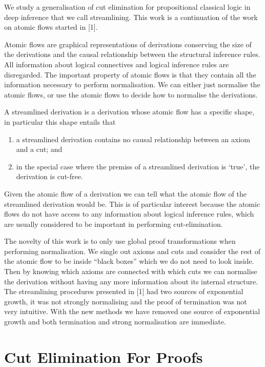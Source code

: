 \documentclass[a4paper]{amsart}
\theoremstyle{remark}
\theoremstyle{definition}
\begin{document}
We study a generalisation of cut elimination for propositional classical logic in deep inference that we call streamlining. This work is a continuation of the work on atomic ﬂows started in [1].

Atomic ﬂows are graphical representations of derivations conserving the size of the derivations and the causal relationship between the structural inference rules. All information about logical connectives and logical inference rules are disregarded. The important property of atomic ﬂows is that they contain all the information necessary to perform normalisation. We can either just normalise the atomic ﬂows, or use the atomic ﬂows to decide how to normalise the derivations.

A streamlined derivation is a derivation whose atomic ﬂow has a speciﬁc
shape, in particular this shape entails that

\begin{enumerate}
\item a streamlined derivation contains no causal relationship between an axiom and a cut; and
\item in the special case where the premiss of a streamlined derivation is ‘true’, the derivation is cut-free.
\end{enumerate}

Given the atomic ﬂow of a derivation we can tell what the atomic ﬂow of the streamlined derivation would be. This is of particular interest because the atomic ﬂows do not have access to any information about logical inference rules, which are usually considered to be important in performing cut-elimination.

The novelty of this work is to only use global proof transformations when performing normalisation. We single out axioms and cuts and consider the rest of the atomic ﬂow to be inside ``black boxes'' which we do not need to look inside. Then by knowing which axioms are connected with which cuts we can normalise the derivation without having any more information about its internal structure. The streamlining procedures presented in [1] had two sources of exponential growth, it was not strongly normalising and the proof of termination was not very intuitive. With the new methods we have removed one source of exponential growth and both termination and strong normalisation are immediate.


\section{Cut Elimination For Proofs}
\end{document}
